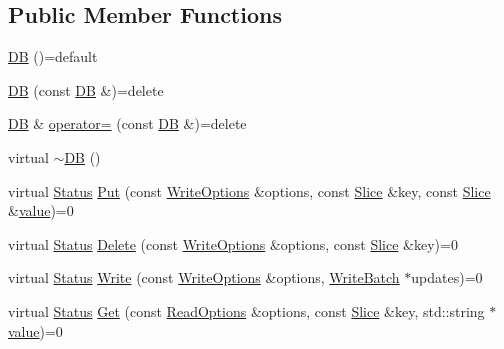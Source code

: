 \subsection*{Public Member Functions}
\begin{DoxyCompactItemize}
\item 
\mbox{\hyperlink{classleveldb_1_1_d_b_ac673450f7af2426a7987efbd2b50b890}{DB}} ()=default
\item 
\mbox{\hyperlink{classleveldb_1_1_d_b_a64ee5ad8810f4e7985fb4ace28789ceb}{DB}} (const \mbox{\hyperlink{classleveldb_1_1_d_b}{DB}} \&)=delete
\item 
\mbox{\hyperlink{classleveldb_1_1_d_b}{DB}} \& \mbox{\hyperlink{classleveldb_1_1_d_b_a556cd1a16e1abb8f7f6cbe1f8b843097}{operator=}} (const \mbox{\hyperlink{classleveldb_1_1_d_b}{DB}} \&)=delete
\item 
virtual \mbox{\hyperlink{classleveldb_1_1_d_b_a15f516eb9ec41812419a7160b4740a22}{$\sim$\+DB}} ()
\item 
virtual \mbox{\hyperlink{classleveldb_1_1_status}{Status}} \mbox{\hyperlink{classleveldb_1_1_d_b_ac2e472812630ed74298df7b03b08c1ae}{Put}} (const \mbox{\hyperlink{structleveldb_1_1_write_options}{Write\+Options}} \&options, const \mbox{\hyperlink{classleveldb_1_1_slice}{Slice}} \&key, const \mbox{\hyperlink{classleveldb_1_1_slice}{Slice}} \&\mbox{\hyperlink{version__set_8cc_a38c8b88c432e666ad10b0c5573e1160a}{value}})=0
\item 
virtual \mbox{\hyperlink{classleveldb_1_1_status}{Status}} \mbox{\hyperlink{classleveldb_1_1_d_b_aff7577239799cd059464701c548090b9}{Delete}} (const \mbox{\hyperlink{structleveldb_1_1_write_options}{Write\+Options}} \&options, const \mbox{\hyperlink{classleveldb_1_1_slice}{Slice}} \&key)=0
\item 
virtual \mbox{\hyperlink{classleveldb_1_1_status}{Status}} \mbox{\hyperlink{classleveldb_1_1_d_b_ae0b6ded8c8e0b88ff70190bf7a0c086c}{Write}} (const \mbox{\hyperlink{structleveldb_1_1_write_options}{Write\+Options}} \&options, \mbox{\hyperlink{classleveldb_1_1_write_batch}{Write\+Batch}} $\ast$updates)=0
\item 
virtual \mbox{\hyperlink{classleveldb_1_1_status}{Status}} \mbox{\hyperlink{classleveldb_1_1_d_b_ad43bd7937b9af88ff856eb8158890911}{Get}} (const \mbox{\hyperlink{structleveldb_1_1_read_options}{Read\+Options}} \&options, const \mbox{\hyperlink{classleveldb_1_1_slice}{Slice}} \&key, std\+::string $\ast$\mbox{\hyperlink{version__set_8cc_a38c8b88c432e666ad10b0c5573e1160a}{value}})=0
\item 

\end{DoxyCompactItemize}
